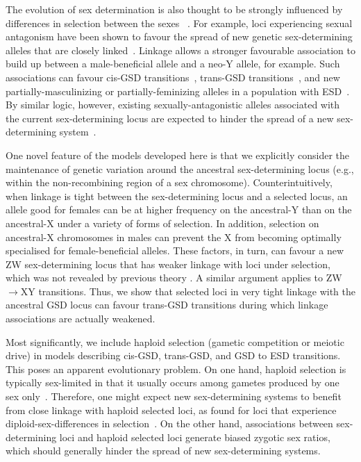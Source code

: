 \documentclass[10pt,letterpaper]{article}
\begin{document}
The evolution of sex determination is also thought to be strongly influenced by differences in selection between the sexes ~\cite{Blaser2012, Beukeboom:2014vb,vanDoorn2014re}.
For example, loci experiencing sexual antagonism have been shown to favour the spread of new genetic sex-determining alleles that are closely linked~\cite{vanDoorn:2007eu,vanDoorn:2010hu,Muralidhar2018}. 
Linkage allows a stronger favourable association to build up between a male-beneficial allele and a neo-Y allele, for example. 
Such associations can favour cis-GSD transitions~\cite{vanDoorn:2007eu}, trans-GSD transitions~\cite{vanDoorn:2010hu}, and new partially-masculinizing or partially-feminizing alleles in a population with ESD~\cite{Muralidhar2018}.
By similar logic, however, existing sexually-antagonistic alleles associated with the current sex-determining locus are expected to hinder the spread of a new sex-determining system~\cite{vanDoorn:2007eu,vanDoorn:2010hu}.

One novel feature of the models developed here is that we explicitly consider the maintenance of genetic variation around the ancestral sex-determining locus (e.g., within the non-recombining region of a sex chromosome).  
Counterintuitively, when linkage is tight between the sex-determining locus and a selected locus, an allele good for females can be at higher frequency on the ancestral-Y than on the ancestral-X under a variety of forms of selection.
In addition, selection on ancestral-X chromosomes in males can prevent the X from becoming optimally specialised for female-beneficial alleles. 
These factors, in turn, can favour a new ZW sex-determining locus that has weaker linkage with loci under selection, which was not revealed by previous theory \cite{vanDoorn:2010hu}. A similar argument applies to ZW$\rightarrow$XY transitions. 
Thus, we show that selected loci in very tight linkage with the ancestral GSD locus can favour trans-GSD transitions during which linkage associations are actually weakened. 

Most significantly, we include haploid selection (gametic competition or meiotic drive) in models describing cis-GSD, trans-GSD, and GSD to ESD transitions.
This poses an apparent evolutionary problem. 
On one hand, haploid selection is typically sex-limited in that it usually occurs among gametes produced by one sex only~\cite{Mulcahy:1996ha,JOSEPH:2004haa,Ubeda:2005gw,Lindholm:2016cw}. 
Therefore, one might expect new sex-determining systems to benefit from close linkage with haploid selected loci, as found for loci that experience diploid-sex-differences in selection~\cite{vanDoorn:2007eu,vanDoorn:2010hu, Muralidhar2018}. 
On the other hand, associations between sex-determining loci and haploid selected loci generate biased zygotic sex ratios, which should generally hinder the spread of new sex-determining systems. 
\end{document}
